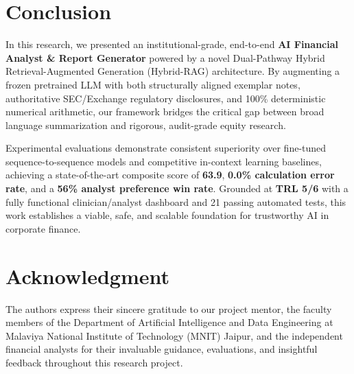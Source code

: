 \documentclass[conference]{IEEEtran}
\begin{document}
\section{Conclusion}
In this research, we presented an institutional-grade, end-to-end \textbf{AI Financial Analyst \& Report Generator} powered by a novel Dual-Pathway Hybrid Retrieval-Augmented Generation (Hybrid-RAG) architecture. By augmenting a frozen pretrained LLM with both structurally aligned exemplar notes, authoritative SEC/Exchange regulatory disclosures, and 100\% deterministic numerical arithmetic, our framework bridges the critical gap between broad language summarization and rigorous, audit-grade equity research. 

Experimental evaluations demonstrate consistent superiority over fine-tuned sequence-to-sequence models and competitive in-context learning baselines, achieving a state-of-the-art composite score of \textbf{63.9}, \textbf{0.0\% calculation error rate}, and a \textbf{56\% analyst preference win rate}. Grounded at \textbf{TRL 5/6} with a fully functional clinician/analyst dashboard and 21 passing automated tests, this work establishes a viable, safe, and scalable foundation for trustworthy AI in corporate finance.

\section*{Acknowledgment}
The authors express their sincere gratitude to our project mentor, the faculty members of the Department of Artificial Intelligence and Data Engineering at Malaviya National Institute of Technology (MNIT) Jaipur, and the independent financial analysts for their invaluable guidance, evaluations, and insightful feedback throughout this research project.



\end{document}
